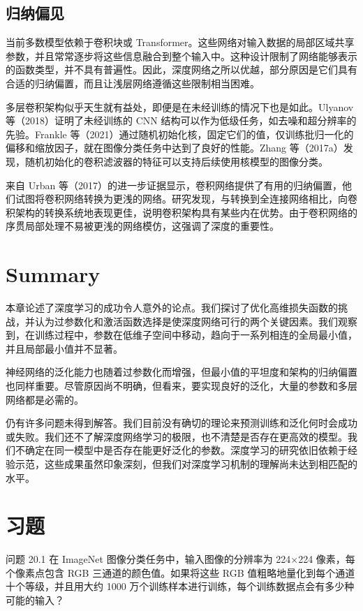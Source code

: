 \subsection{归纳偏见}
当前多数模型依赖于卷积块或 Transformer。这些网络对输入数据的局部区域共享参数，并且常常逐步将这些信息融合到整个输入中。这种设计限制了网络能够表示的函数类型，并不具有普遍性。因此，深度网络之所以优越，部分原因是它们具有合适的归纳偏置，而且让浅层网络遵循这些限制相当困难。

多层卷积架构似乎天生就有益处，即便是在未经训练的情况下也是如此。Ulyanov 等（2018）证明了未经训练的 CNN 结构可以作为低级任务，如去噪和超分辨率的先验。Frankle 等（2021）通过随机初始化核，固定它们的值，仅训练批归一化的偏移和缩放因子，就在图像分类任务中达到了良好的性能。Zhang 等（2017a）发现，随机初始化的卷积滤波器的特征可以支持后续使用核模型的图像分类。

来自 Urban 等（2017）的进一步证据显示，卷积网络提供了有用的归纳偏置，他们试图将卷积网络转换为更浅的网络。研究发现，与转换到全连接网络相比，向卷积架构的转换系统地表现更佳，说明卷积架构具有某些内在优势。由于卷积网络的序贯局部处理不易被更浅的网络模仿，这强调了深度的重要性。


\section{Summary}
本章论述了深度学习的成功令人意外的论点。我们探讨了优化高维损失函数的挑战，并认为过参数化和激活函数选择是使深度网络可行的两个关键因素。我们观察到，在训练过程中，参数在低维子空间中移动，趋向于一系列相连的全局最小值，并且局部最小值并不显著。

神经网络的泛化能力也随着过参数化而增强，但最小值的平坦度和架构的归纳偏置也同样重要。尽管原因尚不明确，但看来，要实现良好的泛化，大量的参数和多层网络都是必需的。

仍有许多问题未得到解答。我们目前没有确切的理论来预测训练和泛化何时会成功或失败。我们还不了解深度网络学习的极限，也不清楚是否存在更高效的模型。我们不确定在同一模型中是否存在能更好泛化的参数。深度学习的研究依旧依赖于经验示范，这些成果虽然印象深刻，但我们对深度学习机制的理解尚未达到相匹配的水平。

\section{习题}
问题 20.1 在 ImageNet 图像分类任务中，输入图像的分辨率为 224×224 像素，每个像素点包含 RGB 三通道的颜色值。如果将这些 RGB 值粗略地量化到每个通道十个等级，并且用大约 1000 万个训练样本进行训练，每个训练数据点会有多少种可能的输入？

